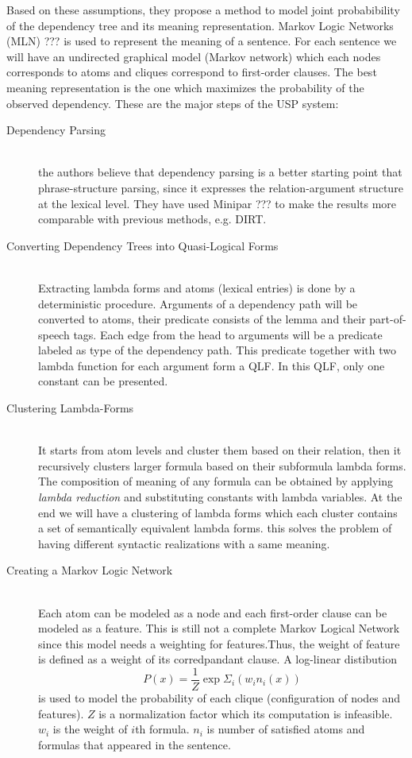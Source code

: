 \documentclass[12pt]{report}
\begin{document}
Based on these assumptions, they propose a method to model joint probabibility of the dependency tree
and its meaning representation. Markov Logic Networks (MLN) ??? is used to represent the meaning of a sentence.
For each sentence we will have an undirected graphical model (Markov network) which each nodes corresponds to atoms
and cliques correspond to first-order clauses. The best meaning representation is the one which 
maximizes the probability of the observed dependency. %
These are the major steps of the USP system:
\begin{description}
  \item[Dependency Parsing] \hfill \\
  the authors believe that dependency parsing is a better starting point that phrase-structure parsing, since it expresses
   the relation-argument structure at the lexical level. They have used Minipar ??? to make the results more comparable with previous
   methods, e.g. DIRT.
  \item[Converting Dependency Trees into Quasi-Logical Forms] \hfill \\
  Extracting lambda forms and atoms (lexical entries) is done by a deterministic procedure. 
  Arguments of a dependency path will be converted to atoms, their predicate consists of the lemma and their part-of-speech tags.
  Each edge from the head to arguments will be a predicate labeled as type of the dependency path.
  This predicate together with two lambda function for each argument form a QLF. In this QLF, only one constant can be presented.
  
  \item[Clustering Lambda-Forms] \hfill \\
  It starts from atom levels and cluster them based on their relation, then it recursively clusters larger formula
  based on their subformula lambda forms. The composition of meaning of any formula can be obtained by applying
  \emph{lambda reduction} and substituting constants with lambda variables. At the end we will have a clustering
  of lambda forms which each cluster contains a set of semantically equivalent lambda forms. this solves
   the problem of having different syntactic realizations with a same meaning.
  
  \item[Creating a Markov Logic Network] \hfill \\
  Each atom can be modeled as a node and each first-order clause can be modeled as a feature. This is still not a complete Markov Logical
  Network since this model needs a weighting for features.Thus, the weight of feature is defined as a weight of
  its corredpandant clause. A log-linear distibution 
  $$ P(x) = \frac{1}{Z}\exp{\Sigma_i{(w_i n_i (x))}} $$
  is used to model the probability of each clique (configuration of nodes and features).
  $Z$ is a normalization factor which its computation is infeasible. $w_i$ is the weight of $i$th formula.
  $n_i$ is number of satisfied atoms and formulas that appeared in the sentence. 
   

\end{description}
\end{document}
